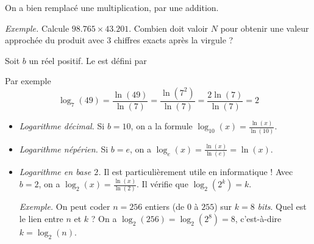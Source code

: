 \documentclass[11pt,class=report,crop=false]{standalone}
\begin{document}
\begin{activite}
\begin{enumerate}
	On a bien remplacé une multiplication, par une addition.
	
	\emph{Exemple.} Calcule $98.765 \times 43.201$. Combien doit valoir $N$ pour obtenir une valeur approchée du produit avec $3$ chiffres exacts après la virgule ?
	
  \end{enumerate}
 
\end{activite}





\begin{cours}

Soit $b$ un réel positif.
Le  est défini par 

Par exemple 
$$\log_7(49) = \frac{\ln(49)}{\ln(7)} =  \frac{\ln(7^2)}{\ln(7)} 
= \frac{2\ln(7)}{\ln(7)} = 2$$


\begin{itemize}
  \item \emph{Logarithme décimal.}
  Si $b=10$, on a la formule $\log_{10}(x) = \frac{\ln(x)}{\ln(10)}$.
  
  \item \emph{Logarithme népérien.}
  Si $b=e$, on a $\log_e(x) = \frac{\ln(x)}{\ln(e)} = \ln(x)$.
  
  \item \emph{Logarithme en base $2$.}
  Il est particulièrement utile en informatique !
  Avec $b=2$, on a $\log_2(x) = \frac{\ln(x)}{\ln(2)}$.
  Il vérifie que $\log_2(2^k) = k$.
  
  \emph{Exemple.} On peut coder $n=256$ entiers (de $0$ à $255$) sur $k=8$ \emph{bits}. Quel est le lien entre $n$ et $k$ ? On a $\log_2(256) = \log_2(2^8) = 8$, 
  c'est-à-dire $k=\log_2(n)$.
\end{itemize}

\end{cours}


\end{document}
